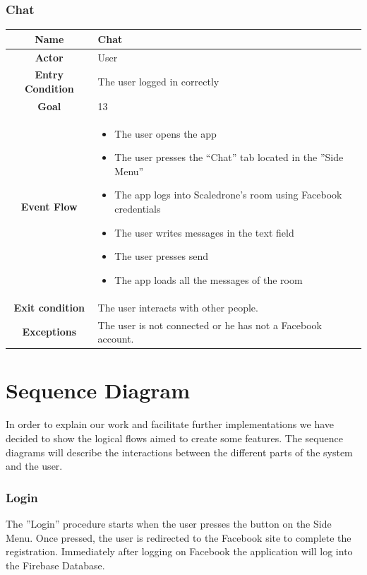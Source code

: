 \documentclass[numbers=noenddot, 12pt, a4paper, oneside]{scrbook}
\begin{document}
\subsection*{Chat}
\begin{tabular}{|c|p{}|}
	\hline
	\parbox[c][6ex]{6ex}{\centering \textbf{Name}} & Chat\\
	\hline
	\parbox[c][6ex]{6ex}{\centering \textbf{Actor}} & User \\
	\hline
	\parbox[c][10ex]{15ex}{\centering \textbf{Entry Condition}} & The user logged in correctly \\
	\hline
	\parbox[c][6ex]{15ex}{\centering \textbf{Goal}} &  13\\
	\hline
	\parbox[c][10ex]{12ex}{\centering \textbf{Event Flow}} & \begin{itemize}
		\item The user opens the app
		\item The user presses the “Chat” tab located in the ”Side Menu”
		\item The app logs into Scaledrone’s room using Facebook credentials  
		\item The user writes messages in the text field 
		\item The user presses send 
		\item The app loads all the messages of the room 
		
	\end{itemize}\\
	\hline
	\parbox[c][7ex]{12ex}{\centering \textbf{Exit condition}} & The user interacts with other people. \\\hline
	\parbox[c][10ex]{13ex}{\centering \textbf{Exceptions}} & The user is not connected or he has not a Facebook account.\\ \hline	
\end{tabular}
\newpage


\chapter{Sequence Diagram}
In order to explain our work and facilitate further implementations we have decided to show the logical flows aimed to create some features. The sequence diagrams will describe the interactions between the different parts of the system and the user.

\subsection*{Login}
The ”Login” procedure starts when the user presses the button on the Side Menu.  Once pressed, the user is redirected to the Facebook site to complete the registration. Immediately after logging on Facebook the application will log into the Firebase Database.
\end{document}
